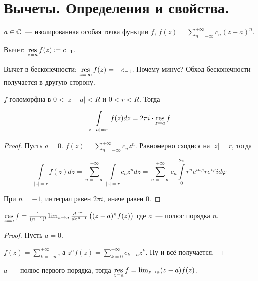 \section{Вычеты. Определения и свойства.}

\begin{definition}
    $a \in \mathbb{C}$~--- изолированная особая точка функции $f$,
    $f(z) = \sum\limits_{n=-\infty}^{+\infty} c_n (z-a)^n$.

    Вычет: $\operatorname*{res}\limits_{z=a} f(z) \coloneqq c_{-1}$.
\end{definition}

\begin{definition}
    Вычет в бесконечности:
    $\operatorname*{res}\limits_{z=\infty} f(z) = -c_{-1}$.
    Почему минус? Обход бесконечности получается в другую сторону.
\end{definition}

\begin{property}
    $f$ голоморфна в $0 < |z-a| < R$ и $0 < r < R$.
    Тогда

    \[
        \int\limits_{|z-a|=r} f(z)dz = 2\pi i \cdot \operatorname*{res}\limits_{z = a} f
    \]
\end{property}

\begin{proof}
    Пусть $a = 0$. $f(z) = \sum\limits_{n=-\infty}^{+\infty} c_nz^n$.
    Равномерно сходися на $|z| = r$, тогда

    \[
        \int\limits_{|z|=r} f(z)dz = \sum\limits_{n=-\infty}^{+\infty}
        \int\limits_{|z|=r} c_nz^ndz
        = \sum\limits_{n=-\infty}^{+\infty} c_n
        \int\limits_{0}^{2\pi} r^ne^{in\varphi} re^{i\varphi} id\varphi
    \]

    При $n = -1$, интеграл равен $2\pi i$, иначе равен $0$.
\end{proof}

\begin{property}
    $\operatorname*{res}\limits_{z=a} f = \frac{1}{(n-1)!} \lim_{z\to a}
        \frac{d^{n-1}}{dz^{n-1}} \left((z-a)^n f(z)\right)$
    где $a$~--- полюс порядка $n$.
\end{property}

\begin{proof}
    Пусть $a = 0$.

    $f(z) = \sum\limits_{k=-n}^{+\infty}$,
    а
    $z^nf(z) = \sum\limits_{k=0}^{+\infty} c_{k-n}z^k$.
    Ну и всё получается.
\end{proof}

\begin{property}
    $a$~--- полюс первого порядка, тогда
    $\operatorname*{res}\limits_{z = a} f = \lim_{z\to a} (z-a)f(z)$.
\end{property}

